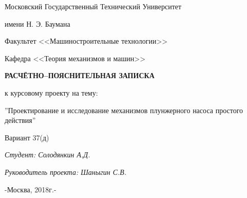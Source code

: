 \documentclass[a4paper]{article} %
\begin{document}
	\pagestyle{empty}
	\begin{center}
		Московский Государственный Технический Университет
		
		имени Н. Э. Баумана
	\end{center}
	\underline{\hspace{0.9\textwidth}}
	\vfill
	\vfill
	\begin{center}
		Факультет <<Машиностроительные технологии>>
		
		Кафедра <<Теория механизмов и машин>>
	\end{center}
	\vfill
	\vfill
	\vfill
	\begin{center}
		\large
		\textbf{РАСЧЁТНО--ПОЯСНИТЕЛЬНАЯ ЗАПИСКА}
	\end{center}
	
	\begin{center}
		к курсовому проекту на тему:
	\end{center}
	\begin{center}
		\large
		''Проектирование и исследование механизмов плунжерного насоса простого действия''
	\end{center}
	
	\begin{center}
		Вариант 37(д)
	\end{center}
	\vfill
	\vfill
	\textit{Студент: Солодянкин А.Д.}
	
	\noindent\textit{Руководитель проекта: Шаныгин С.В.}
	
	\underline{\hspace{0.9\textwidth}}
	
	\begin{center}
		-Москва, 2018г.-
	\end{center}
	\clearpage
	\pagestyle{fancy} %
	\fancyhf{} %
	\fancyhead[R]{\normalsize \thepage} %
	\renewcommand{\headrulewidth}{0pt} %
	
	\newpage
	\tableofcontents
	\newpage
	
	\newpage
	
	\newpage
	
	\newpage
	
	\newpage
	
	\newpage
	
	\newpage
	
	\newpage
	
	\newpage
	
\end{document}
